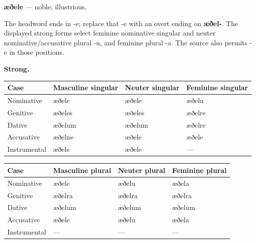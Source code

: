 \par\begin{minipage}{\linewidth}\raggedright
\textbf{æðele} — noble; illustrious.

The headword ends in -e; replace that -e with an overt ending on \textbf{æðel-}. The displayed strong forms select feminine nominative singular and neuter nominative/\allowbreak{}accusative plural -u, and feminine plural -a. The source also permits -e in those positions.

\textbf{Strong.}

\par\begingroup
\fontsize{10.5}{13.2}\selectfont
\setlength{\LTleft}{0pt}\setlength{\LTright}{\fill}
\noindent
\begin{tabular}{@{}>{\raggedright\arraybackslash}p{22.0mm}>{\raggedright\arraybackslash}p{31.188mm}>{\raggedright\arraybackslash}p{31.188mm}>{\raggedright\arraybackslash}p{31.188mm}@{}}
\toprule
\textbf{Case} & \textbf{Masculine singular} & \textbf{Neuter singular} & \textbf{Feminine singular} \\
\midrule
Nominative & æðele & æðele & æðelu \\
Genitive & æðeles & æðeles & æðelre \\
Dative & æðelum & æðelum & æðelre \\
Accusative & æðelne & æðele & æðele \\
Instrumental & æðele & æðele & — \\
\bottomrule
\end{tabular}
\par\endgroup
\end{minipage}\par
\par\addvspace{5pt}
\par\begingroup
\fontsize{10.5}{13.2}\selectfont
\setlength{\LTleft}{0pt}\setlength{\LTright}{\fill}
\noindent
\begin{tabular}{@{}>{\raggedright\arraybackslash}p{22.0mm}>{\raggedright\arraybackslash}p{31.188mm}>{\raggedright\arraybackslash}p{31.188mm}>{\raggedright\arraybackslash}p{31.188mm}@{}}
\toprule
\textbf{Case} & \textbf{Masculine plural} & \textbf{Neuter plural} & \textbf{Feminine plural} \\
\midrule
Nominative & æðele & æðelu & æðela \\
Genitive & æðelra & æðelra & æðelra \\
Dative & æðelum & æðelum & æðelum \\
Accusative & æðele & æðelu & æðela \\
Instrumental & — & — & — \\
\bottomrule
\end{tabular}
\par\endgroup

